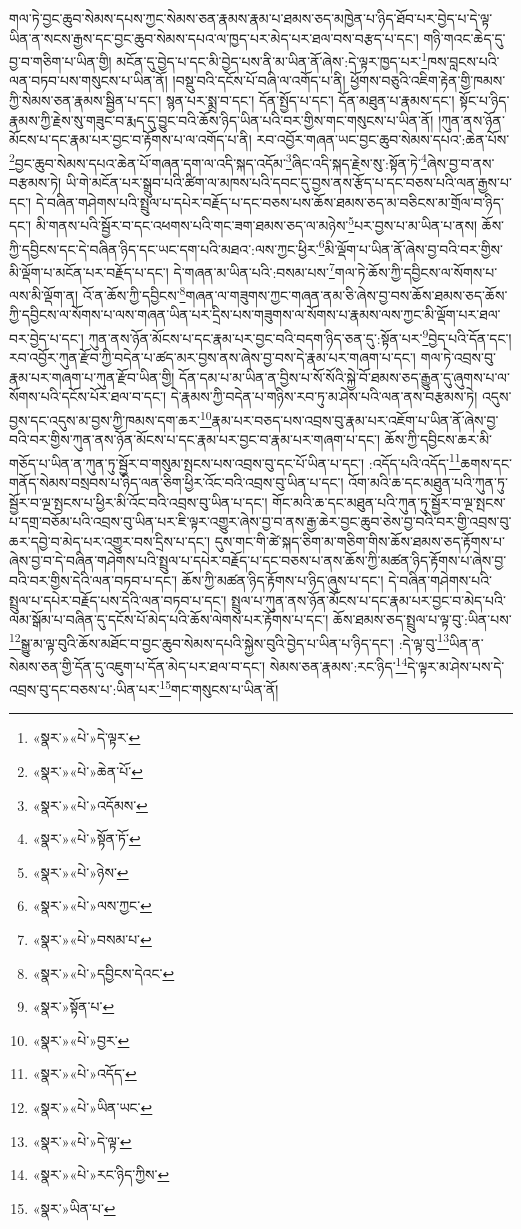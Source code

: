 གལ་ཏེ་བྱང་ཆུབ་སེམས་དཔས་ཀྱང་སེམས་ཅན་རྣམས་རྣམ་པ་ཐམས་ཅད་མཁྱེན་པ་ཉིད་ཐོབ་པར་བྱེད་པ་དེ་ལྟ་ཡིན་ན་སངས་རྒྱས་དང་བྱང་ཆུབ་སེམས་དཔའ་ལ་ཁྱད་པར་མེད་པར་ཐལ་བས་བརྩད་པ་དང་། གཉི་གའང་ཆེད་དུ་བྱ་བ་གཅིག་པ་ཡིན་གྱི། མངོན་དུ་བྱེད་པ་དང་མི་བྱེད་པས་ནི་མ་ཡིན་ནོ་ཞེས་:དེ་ལྟར་ཁྱད་པར་\footnote{«སྣར་»«པེ་»དེ་ལྟར་}ཁས་བླངས་པའི་ལན་བཏབ་པས་གསུངས་པ་ཡིན་ནོ། །བསྡུ་བའི་དངོས་པོ་བཞི་ལ་འགོད་པ་ནི། ཕྱོགས་བཅུའི་འཇིག་རྟེན་གྱི་ཁམས་ཀྱི་སེམས་ཅན་རྣམས་སྦྱིན་པ་དང་། སྙན་པར་སྨྲ་བ་དང་། དོན་སྤྱོད་པ་དང་། དོན་མཐུན་པ་རྣམས་དང་། སྟོང་པ་ཉིད་རྣམས་ཀྱི་རྗེས་སུ་གཟུང་བ་རྨད་དུ་བྱུང་བའི་ཆོས་ཉིད་ཡིན་པའི་བར་གྱིས་གང་གསུངས་པ་ཡིན་ནོ། །ཀུན་ནས་ཉོན་མོངས་པ་དང་རྣམ་པར་བྱང་བ་རྟོགས་པ་ལ་འགོད་པ་ནི། རབ་འབྱོར་གཞན་ཡང་བྱང་ཆུབ་སེམས་དཔའ་:ཆེན་པོས་\footnote{«སྣར་»«པེ་»ཆེན་པོ་}བྱང་ཆུབ་སེམས་དཔའ་ཆེན་པོ་གཞན་དག་ལ་འདི་སྐད་འདོམ་\footnote{«སྣར་»«པེ་»འདོམས་}ཞིང་འདི་སྐད་རྗེས་སུ་:སྟོན་ཏེ་\footnote{«སྣར་»«པེ་»སྟོན་ཏོ་}ཞེས་བྱ་བ་ནས་བརྩམས་ཏེ། ཡི་གེ་མངོན་པར་སྒྲུབ་པའི་ཚིག་ལ་མཁས་པའི་དབང་དུ་བྱས་ནས་རྩོད་པ་དང་བཅས་པའི་ལན་རྒྱས་པ་དང་། དེ་བཞིན་གཤེགས་པའི་སྤྲུལ་པ་དཔེར་བརྗོད་པ་དང་བཅས་པས་ཆོས་ཐམས་ཅད་མ་བཅིངས་མ་གྲོལ་བ་ཉིད་དང་། མི་གནས་པའི་སྦྱོར་བ་དང་འཕགས་པའི་གང་ཟག་ཐམས་ཅད་ལ་མཉེས་\footnote{«སྣར་»«པེ་»ཉེས་}པར་བྱས་པ་མ་ཡིན་པ་ནས། ཆོས་ཀྱི་དབྱིངས་དང་དེ་བཞིན་ཉིད་དང་ཡང་དག་པའི་མཐའ་:ལས་ཀྱང་ཕྱིར་\footnote{«སྣར་»«པེ་»ལས་ཀྱང་}མི་ལྡོག་པ་ཡིན་ནོ་ཞེས་བྱ་བའི་བར་གྱིས་མི་ལྡོག་པ་མངོན་པར་བརྗོད་པ་དང་། དེ་གཞན་མ་ཡིན་པའི་:བསམ་པས་\footnote{«སྣར་»«པེ་»བསམ་པ་}གལ་ཏེ་ཆོས་ཀྱི་དབྱིངས་ལ་སོགས་པ་ལས་མི་ལྡོག་ན། འོ་ན་ཆོས་ཀྱི་དབྱིངས་\footnote{«སྣར་»«པེ་»དབྱིངས་དེའང་}གཞན་ལ་གཟུགས་ཀྱང་གཞན་ནམ་ཅི་ཞེས་བྱ་བས་ཆོས་ཐམས་ཅད་ཆོས་ཀྱི་དབྱིངས་ལ་སོགས་པ་ལས་གཞན་ཡིན་པར་དྲིས་པས་གཟུགས་ལ་སོགས་པ་རྣམས་ལས་ཀྱང་མི་ལྡོག་པར་ཐལ་བར་བྱེད་པ་དང་། ཀུན་ནས་ཉོན་མོངས་པ་དང་རྣམ་པར་བྱང་བའི་བདག་ཉིད་ཅན་དུ་:སྟོན་པར་\footnote{«སྣར་»སྟོན་པ་}བྱེད་པའི་དོན་དང་། རབ་འབྱོར་ཀུན་རྫོབ་ཀྱི་བདེན་པ་ཚད་མར་བྱས་ནས་ཞེས་བྱ་བས་དེ་རྣམ་པར་གཞག་པ་དང་། གལ་ཏེ་འབྲས་བུ་རྣམ་པར་གཞག་པ་ཀུན་རྫོབ་ཡིན་གྱི། དོན་དམ་པ་མ་ཡིན་ན་བྱིས་པ་སོ་སོའི་སྐྱེ་བོ་ཐམས་ཅད་རྒྱུན་དུ་ཞུགས་པ་ལ་སོགས་པའི་དངོས་པོར་ཐལ་བ་དང་། དེ་རྣམས་ཀྱི་བདེན་པ་གཉིས་རབ་ཏུ་མ་ཤེས་པའི་ལན་ནས་བརྩམས་ཏེ། འདུས་བྱས་དང་འདུས་མ་བྱས་ཀྱི་ཁམས་དག་ཆར་\footnote{«སྣར་»«པེ་»བྱར་}རྣམ་པར་བཅད་པས་འབྲས་བུ་རྣམ་པར་འཇོག་པ་ཡིན་ནོ་ཞེས་བྱ་བའི་བར་གྱིས་ཀུན་ནས་ཉོན་མོངས་པ་དང་རྣམ་པར་བྱང་བ་རྣམ་པར་གཞག་པ་དང་། ཆོས་ཀྱི་དབྱིངས་ཆར་མི་གཅོད་པ་ཡིན་ན་ཀུན་ཏུ་སྦྱོར་བ་གསུམ་སྤངས་པས་འབྲས་བུ་དང་པོ་ཡིན་པ་དང་། :འདོད་པའི་འདོད་\footnote{«སྣར་»«པེ་»འདོད་}ཆགས་དང་གནོད་སེམས་བསྲབས་པ་ཉིད་ལན་ཅིག་ཕྱིར་འོང་བའི་འབྲས་བུ་ཡིན་པ་དང་། འོག་མའི་ཆ་དང་མཐུན་པའི་ཀུན་ཏུ་སྦྱོར་བ་ལྔ་སྤངས་པ་ཕྱིར་མི་འོང་བའི་འབྲས་བུ་ཡིན་པ་དང་། གོང་མའི་ཆ་དང་མཐུན་པའི་ཀུན་ཏུ་སྦྱོར་བ་ལྔ་སྤངས་པ་དགྲ་བཅོམ་པའི་འབྲས་བུ་ཡིན་པར་ཇི་ལྟར་འགྱུར་ཞེས་བྱ་བ་ནས་རྒྱ་ཆེར་བྱང་ཆུབ་ཅེས་བྱ་བའི་བར་གྱི་འབྲས་བུ་ཆར་དབྱེ་བ་མེད་པར་འགྱུར་བས་དྲིས་པ་དང་། དུས་གང་གི་ཚེ་སྐད་ཅིག་མ་གཅིག་གིས་ཆོས་ཐམས་ཅད་རྟོགས་པ་ཞེས་བྱ་བ་དེ་བཞིན་གཤེགས་པའི་སྤྲུལ་པ་དཔེར་བརྗོད་པ་དང་བཅས་པ་ནས་ཆོས་ཀྱི་མཚན་ཉིད་རྟོགས་པ་ཞེས་བྱ་བའི་བར་གྱིས་དེའི་ལན་བཏབ་པ་དང་། ཆོས་ཀྱི་མཚན་ཉིད་རྟོགས་པ་ཉིད་ཞུས་པ་དང་། དེ་བཞིན་གཤེགས་པའི་སྤྲུལ་པ་དཔེར་བརྗོད་པས་དེའི་ལན་བཏབ་པ་དང་། སྤྲུལ་པ་ཀུན་ནས་ཉོན་མོངས་པ་དང་རྣམ་པར་བྱང་བ་མེད་པའི་ལམ་སྒོམ་པ་བཞིན་དུ་དངོས་པོ་མེད་པའི་ཆོས་ལེགས་པར་རྟོགས་པ་དང་། ཆོས་ཐམས་ཅད་སྤྲུལ་པ་ལྟ་བུ་:ཡིན་པས་\footnote{«སྣར་»«པེ་»ཡིན་ཡང་}སྒྱུ་མ་ལྟ་བུའི་ཆོས་མཐོང་བ་བྱང་ཆུབ་སེམས་དཔའི་སྐྱེས་བུའི་བྱེད་པ་ཡིན་པ་ཉིད་དང་། :དེ་ལྟ་བུ་\footnote{«སྣར་»«པེ་»དེ་ལྟ་}ཡིན་ན་སེམས་ཅན་གྱི་དོན་དུ་འཇུག་པ་དོན་མེད་པར་ཐལ་བ་དང་། སེམས་ཅན་རྣམས་:རང་ཉིད་\footnote{«སྣར་»«པེ་»རང་ཉིད་ཀྱིས་}དེ་ལྟར་མ་ཤེས་པས་དེ་འབྲས་བུ་དང་བཅས་པ་:ཡིན་པར་\footnote{«སྣར་»ཡིན་པ་}གང་གསུངས་པ་ཡིན་ནོ། 